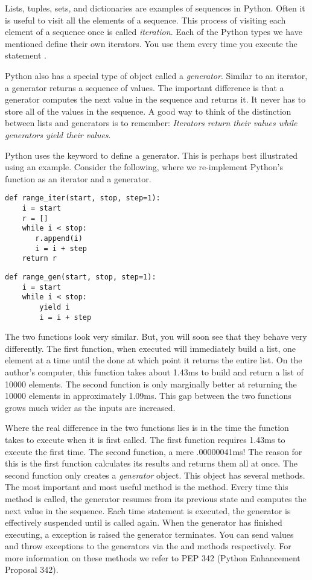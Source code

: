 \label{lab:Python_Generators}

Lists, tuples, sets, and dictionaries are examples of sequences in Python.
Often it is useful to visit all the elements of a sequence.  This process of visiting
each element of a sequence once is called \emph{iteration}. 
Each of the Python types we have mentioned define their own iterators.
You use them every time you execute the statement .

Python also has a special type of object called a \emph{generator}.
Similar to an iterator, a generator returns a sequence of values.
The important difference is that a generator computes the next value in the sequence and returns it.
It never has to store all of the values in the sequence.
A good way to think of the distinction between lists and generators is to remember: \emph{Iterators return their values while generators yield their values}.

Python uses the  keyword to define a generator.  This is perhaps best illustrated using an example.  Consider the following, where we re-implement Python's  function as an iterator and a generator.
\begin{lstlisting}
def range_iter(start, stop, step=1):
    i = start
    r = []
    while i < stop:
       r.append(i)
       i = i + step
    return r
\end{lstlisting}
\begin{lstlisting}
def range_gen(start, stop, step=1):
    i = start
    while i < stop:
        yield i
        i = i + step
\end{lstlisting}
The two functions look very similar.  But, you will soon see that they behave very differently.
The first function, when executed will immediately build a list, one element at a time until the done
at which point it returns the entire list.  On the author's computer, this function takes about 1.43ms
to build and return a list of 10000 elements.  The second function is only marginally better at
returning the 10000 elements in approximately 1.09ms.  
This gap between the two functions grows much wider as the inputs are increased.

Where the real difference in the two functions lies is in the time the function takes to execute when
it is first called.  The first function requires 1.43ms to execute the first time.  The second function,
a mere .00000041ms!  The reason for this is the first function calculates its results and returns them all at once.  The second function only creates a \emph{generator} object.  This object has several methods.
The most important and most useful method is the  method.  Every time this method is called, 
the generator resumes from its previous state and computes the next value in the sequence. Each time  statement is executed, the generator is effectively suspended until  is called again.
When the generator has finished executing, a  exception is raised the generator terminates.
You can send values and throw exceptions to the generators via the  and  methods respectively.
For more information on these methods we refer to PEP 342 (Python Enhancement Proposal 342).

